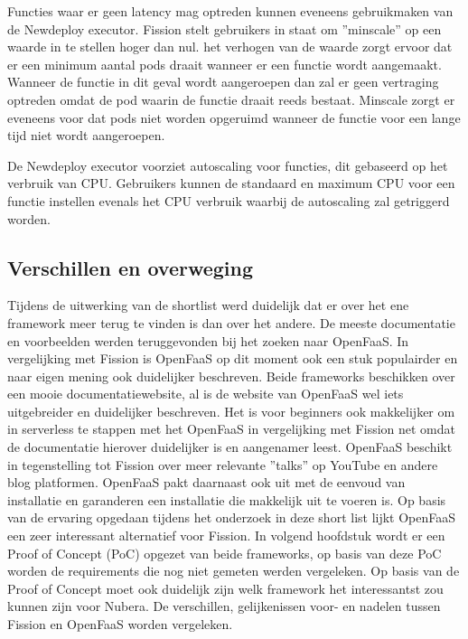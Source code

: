 \begin{description}[style=unboxed, labelwidth=\linewidth, listparindent =0pt]
    
    Functies waar er geen latency mag optreden kunnen eveneens gebruikmaken van de Newdeploy executor. Fission stelt gebruikers in staat om ''minscale'' op een waarde in te stellen hoger dan nul. het verhogen van de waarde zorgt ervoor dat er een minimum aantal pods draait wanneer er een functie wordt aangemaakt. Wanneer de functie in dit geval wordt aangeroepen dan zal er geen vertraging optreden omdat de pod waarin de functie draait reeds bestaat. Minscale zorgt er eveneens voor dat pods niet worden opgeruimd wanneer de functie voor een lange tijd niet wordt aangeroepen.
    \autocite{Fission2019}
    \newpage
   
    \item[Autoscaling]
    De Newdeploy executor voorziet autoscaling voor functies, dit gebaseerd op het verbruik van CPU. Gebruikers kunnen de standaard en maximum CPU voor een functie instellen evenals het CPU verbruik waarbij de autoscaling zal getriggerd worden. \autocite{Fission2019}
    \\
\end{description}

\subsection{Verschillen en overweging}
Tijdens de uitwerking van de shortlist werd duidelijk dat er over het ene framework meer terug te vinden is dan over het andere. De meeste documentatie en voorbeelden werden teruggevonden bij het zoeken naar OpenFaaS. In vergelijking met Fission is OpenFaaS op dit moment ook een stuk populairder en naar eigen mening ook duidelijker beschreven. Beide frameworks beschikken over een mooie documentatiewebsite, al is de website van OpenFaaS wel iets uitgebreider en duidelijker beschreven. Het is voor beginners ook makkelijker om in serverless te stappen met het OpenFaaS in vergelijking met Fission net omdat de documentatie hierover duidelijker is en aangenamer leest. OpenFaaS beschikt in tegenstelling tot Fission over meer relevante ''talks'' op YouTube en andere blog platformen. OpenFaaS pakt daarnaast ook uit met de eenvoud van installatie en garanderen een installatie die makkelijk uit te voeren is. Op basis van de ervaring opgedaan tijdens het onderzoek in deze short list lijkt OpenFaaS een zeer interessant alternatief voor Fission. In volgend hoofdstuk wordt er een Proof of Concept (PoC) opgezet van beide frameworks, op basis van deze PoC worden de requirements die nog niet gemeten werden vergeleken. Op basis van de Proof of Concept moet ook duidelijk zijn welk framework het interessantst zou kunnen zijn voor Nubera. De verschillen, gelijkenissen voor- en nadelen tussen Fission en OpenFaaS worden vergeleken.